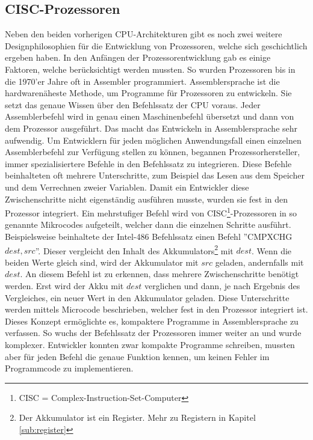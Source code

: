 \documentclass[a4paper,12pt]{article}
\begin{document}
\subsection{CISC-Prozessoren}
Neben den beiden vorherigen CPU-Architekturen gibt es noch zwei weitere Designphilosophien für die Entwicklung von Prozessoren, welche sich geschichtlich ergeben haben. In den Anfängen der Prozessorentwicklung gab es einige Faktoren, welche berücksichtigt werden mussten. So wurden Prozessoren bis in die 1970'er Jahre oft in Assembler programmiert. Assemblersprache ist die hardwarenäheste Methode, um Programme für Prozessoren zu entwickeln. Sie setzt das genaue Wissen über den Befehlssatz der CPU voraus. Jeder Assemblerbefehl wird in genau einen Maschinenbefehl übersetzt und dann von dem Prozessor ausgeführt. Das macht das Entwickeln in Assemblersprache sehr aufwendig. Um Entwicklern für jeden möglichen Anwendungsfall einen einzelnen Assemblerbefehl zur Verfügung stellen zu können, begannen Prozessorhersteller, immer spezialisiertere Befehle in den Befehlssatz zu integrieren. Diese Befehle beinhalteten oft mehrere Unterschritte, zum Beispiel das Lesen aus dem Speicher und dem Verrechnen zweier Variablen. Damit ein Entwickler diese Zwischenschritte nicht eigenständig ausführen musste, wurden sie fest in den Prozessor integriert. Ein mehrstufiger Befehl wird von CISC\footnote{CISC = Complex-Instruction-Set-Computer}-Prozessoren in so genannte Mikrocodes aufgeteilt, welcher dann die einzelnen Schritte ausführt. Beispielsweise beinhaltete der Intel-486 Befehlssatz einen Befehl ''CMPXCHG  $dest,src$''\cite[S.172f]{intel4000}. Dieser vergleicht den Inhalt des Akkumulators\footnote{Der Akkumulator ist ein Register. Mehr zu Registern in Kapitel \ref{sub:register}} mit $dest$. Wenn die beiden Werte gleich sind, wird der Akkumulator mit $src$ geladen, andernfalls mit $dest$. An diesem Befehl ist zu erkennen, dass mehrere Zwischenschritte benötigt werden. Erst wird der Akku mit $dest$ verglichen und dann, je nach Ergebnis des Vergleiches, ein neuer Wert in den Akkumulator geladen. Diese Unterschritte werden mittels Microcode beschrieben, welcher fest in den Prozessor integriert ist. Dieses Konzept ermöglichte es, kompaktere Programme in Assemblersprache zu verfassen. So wuchs der Befehlssatz der Prozessoren immer weiter an und wurde komplexer. Entwickler konnten zwar kompakte Programme schreiben, mussten aber für jeden Befehl die genaue Funktion kennen, um keinen Fehler im Programmcode zu implementieren. 

\end{document}
